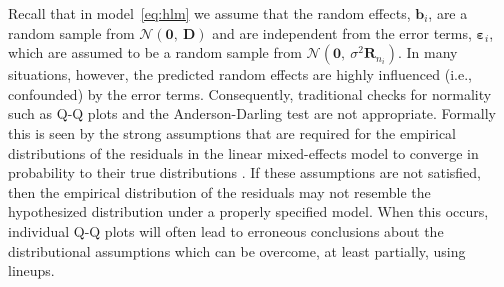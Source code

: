 \documentclass[12pt]{article}
\begin{document}


Recall that in model~\eqref{eq:hlm} we assume that the random effects, $\bm{b}_i$, are a random sample from $\mathcal{N}(\bm{0},\ \bm{D})$ and are independent from the error terms, $\bm{\varepsilon}_i$, which are assumed to be a random sample from $\mathcal{N}(\bm{0},\ \sigma^2 \bm{R}_{n_i})$. In many situations, however, the predicted random effects are highly influenced (i.e., confounded) by the error terms. Consequently, traditional checks for normality such as Q-Q plots and the Anderson-Darling test are not appropriate. 
Formally this is seen by the
strong assumptions that are required for the empirical distributions of the residuals in the linear mixed-effects model to converge in probability to their true distributions \citep[Theorem 3.2 and Lemma 3.1]{Jiang:1998vt}. If these assumptions are not satisfied, then the empirical distribution of the residuals may not resemble the hypothesized distribution under a properly specified model. When this occurs, individual Q-Q plots will often lead to erroneous conclusions about the distributional assumptions which can be overcome, at least partially, using lineups.
\end{document}
